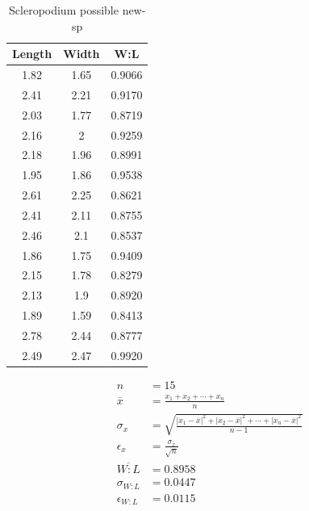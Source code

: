 \documentclass{article}
\begin{document}
\newpage
\begin{table}[h!]
  \begin{center}
    \caption{Scleropodium possible new-sp}
    \begin{tabular}{|c|c|c|}\hline
      Length & Width & W:L \\ \hline
      1.82 & 1.65 & 0.9066 \\ \hline
      2.41 & 2.21 & 0.9170 \\ \hline
      2.03 & 1.77 & 0.8719 \\ \hline
      2.16 & 2 & 0.9259 \\ \hline
      2.18 & 1.96 & 0.8991 \\ \hline
      1.95 & 1.86 & 0.9538 \\ \hline
      2.61 & 2.25 & 0.8621 \\ \hline
      2.41 & 2.11 & 0.8755 \\ \hline
      2.46 & 2.1 & 0.8537 \\ \hline
      1.86 & 1.75 & 0.9409 \\ \hline
      2.15 & 1.78 & 0.8279 \\ \hline
      2.13 & 1.9 & 0.8920 \\ \hline
      1.89 & 1.59 & 0.8413 \\ \hline
      2.78 & 2.44 & 0.8777 \\ \hline
      2.49 & 2.47 & 0.9920 \\ \hline
    \end{tabular}
  \end{center}
  \begin{center}
    \begin{equation}
      \begin{split}
        n &= 15 \\
        \overline{x} &= \frac{x_1 + x_2 + \cdots + x_n}{n} \\
        \sigma_{x} &= \sqrt{\frac{{|x_1 - \overline{x}|}^2 + {|x_2 - \overline{x}|}^2 + \cdots + {|x_n - \overline{x}|}^2}{n-1}} \\
        \epsilon_{x} &= \frac{\sigma_{x}}{\sqrt{n}} \\
        \overline{W:L} &= 0.8958 \\
        \sigma_{W:L} &= 0.0447 \\
        \epsilon_{W:L} &= 0.0115 \\
      \end{split}
    \end{equation}
  \end{center}
\end{table}
\end{document}
